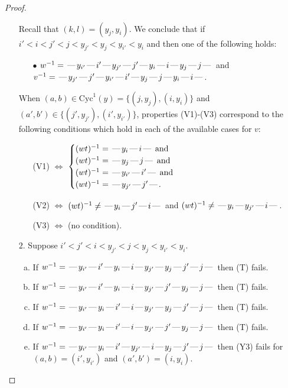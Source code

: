 \documentclass[10pt]{article}
\theoremstyle{definition}
\theoremstyle{definition}
\def\dash{\text{\hspace{0.5mm}---\hspace{0.5mm}}}
\def\Cyc{\mathrm{Cyc}}
\begin{document}
\begin{proof}
\begin{enumerate}
\begin{enumerate}[(a)]
\end{enumerate}
Recall that $(k,l) = (y_j,y_i)$.
We conclude that if $i' < i < j' < j < y_{j'} < y_j < y_{i'} < y_i$ and then one of the following holds:
\begin{enumerate}
\item[$\bullet$] $w^{-1} = \dash y_{i'}\dash i'\dash y_{j'}\dash j'\dash y_i\dash i\dash y_j\dash j\dash $ and $v^{-1} = \dash y_{j'}\dash j'\dash y_{i'}\dash i'\dash y_j\dash j\dash y_i\dash i\dash $.
\end{enumerate}
When $(a,b)\in\Cyc^1(y)=\{(j,y_j),(i,y_i)\}$ and $(a',b')\in\{(j',y_{j'}),(i',y_{i'})\}$,
properties (V1)-(V3) correspond to the following conditions which hold in
each of the available cases for $v$:
\begin{enumerate}
\item[](V1) $\Leftrightarrow$ $\begin{cases}\text{$(wt)^{-1} = \dash y_i \dash i \dash$}\text{ and }\\
\text{$(wt)^{-1} = \dash y_j \dash j \dash$}\text{ and }\\
\text{$(wt)^{-1} = \dash y_{i'} \dash i' \dash$}\text{ and }\\
\text{$(wt)^{-1} = \dash y_{j'} \dash j' \dash$}.\end{cases}$
\item[](V2) $\Leftrightarrow$ $(wt)^{-1} \neq \dash y_i \dash j' \dash i \dash$ and $(wt)^{-1}\neq \dash y_i \dash y_{j'} \dash i \dash$.
\item[](V3) $\Leftrightarrow$ (no condition).
\end{enumerate}
\item[$2$.] Suppose $i' < j' < i < y_{j'} < j < y_j < y_{i'} < y_i$.
\begin{enumerate}[(a)]
\item If $w^{-1} = \dash y_{i'}\dash i'\dash y_i\dash i\dash y_{j'}\dash y_j\dash j'\dash j\dash $ then (T) fails.
\item If $w^{-1} = \dash y_{i'}\dash i'\dash y_i\dash i\dash y_{j'}\dash j'\dash y_j\dash j\dash $ then (T) fails.
\item If $w^{-1} = \dash y_{i'}\dash y_i\dash i'\dash i\dash y_{j'}\dash y_j\dash j'\dash j\dash $ then (T) fails.
\item If $w^{-1} = \dash y_{i'}\dash y_i\dash i'\dash i\dash y_{j'}\dash j'\dash y_j\dash j\dash $ then (T) fails.
\item If $w^{-1} = \dash y_{i'}\dash y_i\dash i'\dash y_{j'}\dash i\dash y_j\dash j'\dash j\dash $ then (Y3) fails for $(a,b)=(i',y_{i'})$ and $(a',b')=(i,y_i)$.

\end{enumerate}
\end{enumerate}
\end{proof}
\end{document}
